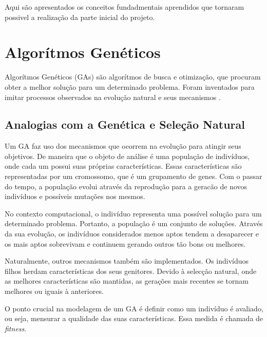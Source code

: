 Aqui são apresentados os conceitos fundadmentais aprendidos que tornaram
possivel a realização da parte inicial do projeto.

\section{Algorítmos Genéticos}

Algorítmos Genéticos (GAs) são algorítmos de busca e otimização, que procuram
obter a melhor solução para um determinado problema. Foram inventados para 
imitar processos observados na evolução natural \cite{davis} e seus mecanismos
\cite{goldberg}.

\subsection{Analogias com a Genética e Seleção Natural}
Um GA faz uso dos mecanismos que ocorrem na evolução para atingir seus objetivos.
De maneira que o objeto de análise é uma população de indivíduos, onde cada um 
possui suas próprias características. Essas características são representadas 
por um cromossomo, que é um grupamento de genes. Com o passar do tempo, a 
população evolui através da reprodução para a geracão de novos indivíduos e 
possíveis mutações nos mesmos. 

No contexto computacional, o indivíduo representa uma possível solução para um
determinado problema. Portanto, a população é um conjunto de soluções. Através
da sua evolução, os indivíduos considerados menos aptos tendem a desaparecer e
os mais aptos sobrevivam e continuem gerando outros tão bons ou melhores.

Naturalmente, outros mecanismos também são implementados. Os indivíduos filhos
herdam características dos seus genitores. Devido à selecção natural, onde as
melhores características são mantidas, as gerações mais recentes se tornam 
melhores ou iguais à anteriores.

O ponto crucial na modelagem de um GA é definir como um indivíduo é avaliado,
ou seja, mensurar a qualidade das suas características. Essa medida é chamada 
de {\it fitness}. 

